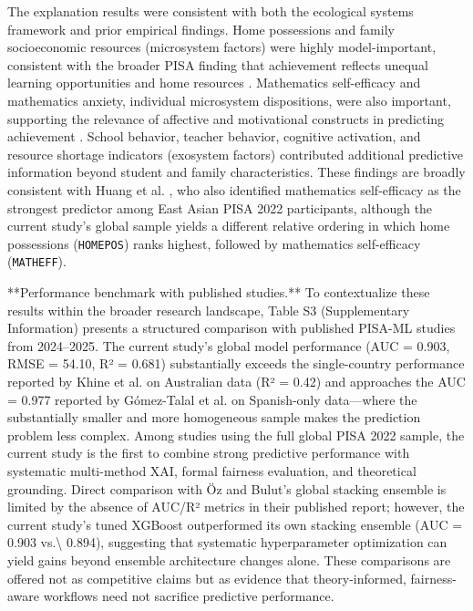 \documentclass[pdflatex,sn-mathphys-ay]{sn-jnl}
\begin{document}
The explanation results were consistent with both the ecological systems framework and prior empirical findings. Home possessions and family socioeconomic resources (microsystem factors) were highly model-important, consistent with the broader PISA finding that achievement reflects unequal learning opportunities and home resources \citep{OECD_2022_results_vol1}. Mathematics self-efficacy and mathematics anxiety, individual microsystem dispositions, were also important, supporting the relevance of affective and motivational constructs in predicting achievement \citep{OECD_2022_results_vol5}. School behavior, teacher behavior, cognitive activation, and resource shortage indicators (exosystem factors) contributed additional predictive information beyond student and family characteristics. These findings are broadly consistent with Huang et al. \citep{Huang_2024}, who also identified mathematics self-efficacy as the strongest predictor among East Asian PISA 2022 participants, although the current study's global sample yields a different relative ordering in which home possessions (\texttt{HOMEPOS}) ranks highest, followed by mathematics self-efficacy (\texttt{MATHEFF}).

**Performance benchmark with published studies.** To contextualize these results within the broader research landscape, Table S3 (Supplementary Information) presents a structured comparison with published PISA-ML studies from 2024--2025. The current study's global model performance (AUC = 0.903, RMSE = 54.10, R² = 0.681) substantially exceeds the single-country performance reported by Khine et al. \citep{Khine_2024} on Australian data (R² = 0.42) and approaches the AUC = 0.977 reported by Gómez-Talal et al. \citep{Gomez_Talal_2025_ieee} on Spanish-only data---where the substantially smaller and more homogeneous sample makes the prediction problem less complex. Among studies using the full global PISA 2022 sample, the current study is the first to combine strong predictive performance with systematic multi-method XAI, formal fairness evaluation, and theoretical grounding. Direct comparison with Öz and Bulut's \citep{Oz_Bulut_2025_stacking} global stacking ensemble is limited by the absence of AUC/R² metrics in their published report; however, the current study's tuned XGBoost outperformed its own stacking ensemble (AUC = 0.903 vs.\textbackslash{} 0.894), suggesting that systematic hyperparameter optimization can yield gains beyond ensemble architecture changes alone. These comparisons are offered not as competitive claims but as evidence that theory-informed, fairness-aware workflows need not sacrifice predictive performance.
\end{document}
